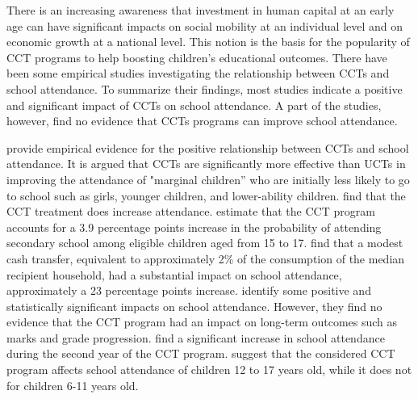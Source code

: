 \documentclass[a4paper, 10pt]{article}
\begin{document}

There is an increasing awareness that investment in human capital at an early age can have significant impacts on social mobility at an individual level and on economic growth at a national level. This notion is the basis for the popularity of CCT programs to help boosting children’s educational outcomes. There have been some empirical studies investigating the relationship between CCTs and school attendance. To summarize their findings, most studies indicate a positive and significant impact of CCTs on school attendance. A part of the studies, however, find no evidence that CCTs programs can improve school attendance.

\cite{akresh2013cash} provide empirical evidence for the positive relationship between CCTs and school attendance. It is argued that CCTs are significantly more effective than UCTs in improving the attendance of "marginal children'' who are initially less likely to go to school such as girls, younger children, and lower-ability children. \cite{Barrera-Osorio2017} find that the CCT treatment does increase attendance. \cite{Edo2017} estimate that the CCT program accounts for a 3.9 percentage points increase in the probability of attending secondary school among eligible children aged from 15 to 17. \cite{Filmer2011} find that a modest cash transfer, equivalent to approximately 2\% of the consumption of the median recipient household, had a substantial impact on school attendance, approximately a 23 percentage points increase. \cite{levy2010} identify some positive and statistically significant impacts on school attendance. However, they find no evidence that the CCT program had an impact on long-term outcomes such as marks and grade progression. \cite{Perova2012} find a significant increase in school attendance during the second year of the CCT program. \cite{Corrales2020} suggest that the considered CCT program affects school attendance of children 12 to 17 years old, while it does not for children 6-11 years old.
\end{document}
